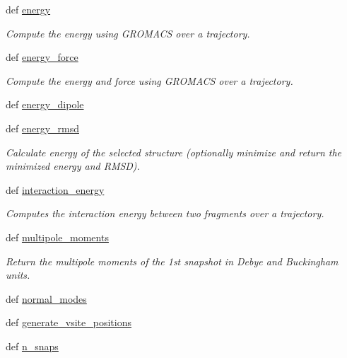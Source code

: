 \begin{DoxyCompactItemize}
def \hyperlink{classforcebalance_1_1gmxio_1_1GMX_a9d1a0545cd9e9a7e8b82ecf3264a1c6e}{energy}
\begin{DoxyCompactList}\small\item\em Compute the energy using G\-R\-O\-M\-A\-C\-S over a trajectory. \end{DoxyCompactList}\item 
def \hyperlink{classforcebalance_1_1gmxio_1_1GMX_afe9f4ef7866ae35b9c641b6f112087c7}{energy\-\_\-force}
\begin{DoxyCompactList}\small\item\em Compute the energy and force using G\-R\-O\-M\-A\-C\-S over a trajectory. \end{DoxyCompactList}\item 
def \hyperlink{classforcebalance_1_1gmxio_1_1GMX_ac5f239d4a189f3e94256107faa50f110}{energy\-\_\-dipole}
\item 
def \hyperlink{classforcebalance_1_1gmxio_1_1GMX_a0213710724d8ca433dd57eea58aa16ba}{energy\-\_\-rmsd}
\begin{DoxyCompactList}\small\item\em Calculate energy of the selected structure (optionally minimize and return the minimized energy and R\-M\-S\-D). \end{DoxyCompactList}\item 
def \hyperlink{classforcebalance_1_1gmxio_1_1GMX_ae6a922df0ab916f8bfa5a79175e9338a}{interaction\-\_\-energy}
\begin{DoxyCompactList}\small\item\em Computes the interaction energy between two fragments over a trajectory. \end{DoxyCompactList}\item 
def \hyperlink{classforcebalance_1_1gmxio_1_1GMX_a1b851b190c4292c49e5c6fd7cb2adc63}{multipole\-\_\-moments}
\begin{DoxyCompactList}\small\item\em Return the multipole moments of the 1st snapshot in Debye and Buckingham units. \end{DoxyCompactList}\item 
def \hyperlink{classforcebalance_1_1gmxio_1_1GMX_a38ec639a4389b5c11afbc410acdef045}{normal\-\_\-modes}
\item 
def \hyperlink{classforcebalance_1_1gmxio_1_1GMX_aea0f6d954e7042b70221a55e600f89a5}{generate\-\_\-vsite\-\_\-positions}
\item 
def \hyperlink{classforcebalance_1_1gmxio_1_1GMX_aa1fa913806c999d11180bbf55b1b0a96}{n\-\_\-snaps}

\end{DoxyCompactItemize}
